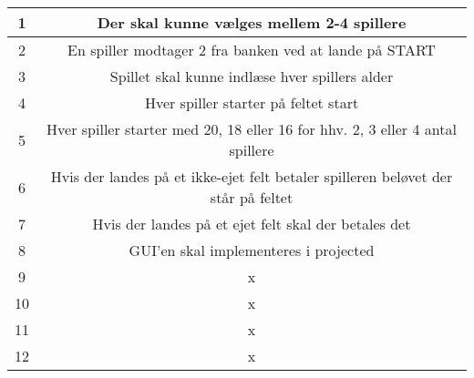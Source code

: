 \begin{center}
\begin{tabular}{ | c | c | } 
\hline
1 & Der skal kunne vælges mellem 2-4 spillere \\ 
\hline
2 & En spiller modtager 2 fra banken ved at lande på START \\ 
\hline
3 & Spillet skal kunne indlæse hver spillers alder \\ 
\hline
4 & Hver spiller starter på feltet start \\ 
\hline
5 & Hver spiller starter med 20, 18 eller 16 for hhv. 2, 3 eller 4 antal spillere \\ 
\hline
6 & Hvis der landes på et ikke-ejet felt betaler spilleren beløvet der står på feltet \\ 
\hline
7 & Hvis der landes på et ejet felt skal der betales det \\ 
\hline
8 & GUI'en skal implementeres i projected \\ 
\hline
9 & x \\ 
\hline
10 & x \\ 
\hline
11 & x \\ 
\hline
12 & x \\ 
\hline
\end{tabular}
\end{center}